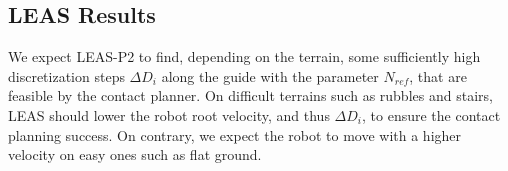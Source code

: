 \subsection{LEAS Results}
\label{subsub:mip:results}





We expect LEAS-P2 to find, depending on the terrain, some sufficiently high discretization steps $\Delta D_i$ along the guide with the parameter $N_{ref}$, that are feasible by the contact planner.
On difficult terrains such as rubbles and stairs, LEAS should lower the robot root velocity, and thus $\Delta D_i$, to ensure the contact planning success. 
On contrary, we expect the robot to move with a higher velocity on easy ones such as flat ground.



